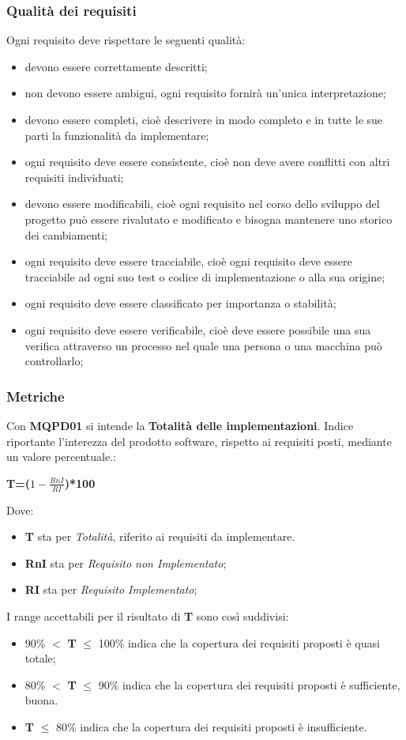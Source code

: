 \subsubsection{Qualità dei requisiti}\label{2.2.3.8}
Ogni requisito deve rispettare le seguenti qualità:
\begin{itemize}
	\item devono essere correttamente descritti;
	\item non devono essere ambigui, ogni requisito fornirà un'unica interpretazione;
	\item devono essere completi, cioè descrivere in modo completo e in tutte le sue parti la funzionalità da implementare;
	\item ogni requisito deve essere consistente, cioè non deve avere conflitti con altri requisiti individuati;
	\item devono essere modificabili, cioè ogni requisito nel corso dello sviluppo del progetto può essere rivalutato e modificato e bisogna mantenere uno storico dei cambiamenti;
	\item ogni requisito deve essere tracciabile, cioè ogni requisito deve essere tracciabile ad ogni suo test o codice di implementazione o alla sua origine;
	\item ogni requisito deve essere classificato per importanza o stabilità;
	\item ogni requisito deve essere verificabile, cioè deve essere possibile una sua verifica attraverso un processo nel quale una persona o una macchina può controllarlo;
\end{itemize}

\subsubsection{Metriche}\label{2.2.3.9}
Con \textbf{MQPD01} si intende la \textbf{Totalità delle implementazioni}. Indice riportante l'interezza del prodotto software, rispetto ai requisiti posti, mediante un valore percentuale.:

\begin{center}
	\textbf{T=($1-\frac{RnI}{RI}$)*100}
\end{center}
Dove:
\begin{itemize}
	\item \textbf{T} sta per \textit{Totalità}, riferito ai requisiti da implementare.
	\item \textbf{RnI} sta per \textit{Requisito non Implementato};
	\item \textbf{RI} sta per \textit{Requisito Implementato};
\end{itemize}
I range accettabili per il risultato di \textbf{T} sono così suddivisi:
\begin{itemize}
	\item 90\% $<$ \textbf{T} $\leq$ 100\% indica che la copertura dei requisiti proposti è quasi totale;
	\item 80\% $<$ \textbf{T} $\leq$ 90\% indica che la copertura dei requisiti proposti è sufficiente, buona.
	\item \textbf{T} $\leq$ 80\% indica che la copertura dei requisiti proposti è insufficiente.
\end{itemize}


